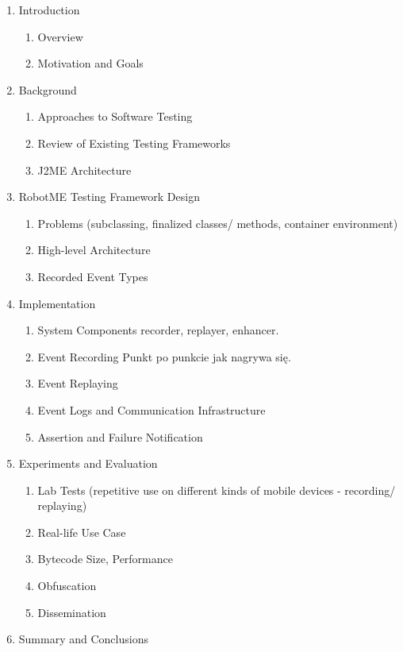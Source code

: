 
\begin{enumerate}
    \item Introduction
        \begin{enumerate}
            \item Overview
            \item Motivation and Goals
        \end{enumerate}
        
    \item Background
        \begin{enumerate}
            \item Approaches to Software Testing
            \item Review of Existing Testing Frameworks
            \item J2ME Architecture
        \end{enumerate}
        
    \item RobotME Testing Framework Design
        \begin{enumerate}
            \item Problems
                (subclassing, finalized classes/ methods, container environment)
            \item High-level Architecture
            \item Recorded Event Types
        \end{enumerate}
        
    \item Implementation
        \begin{enumerate}
            \item System Components
                recorder, replayer, enhancer.
            \item Event Recording
                Punkt po punkcie jak nagrywa się.
            \item Event Replaying
            \item Event Logs and Communication Infrastructure
            \item Assertion and Failure Notification
        \end{enumerate}

     \item Experiments and Evaluation
        \begin{enumerate}
            \item Lab Tests (repetitive use on different kinds of mobile devices - recording/ replaying)
            \item Real-life Use Case
            \item Bytecode Size, Performance
            \item Obfuscation
            \item Dissemination
        \end{enumerate}

    \item Summary and Conclusions
\end{enumerate}
